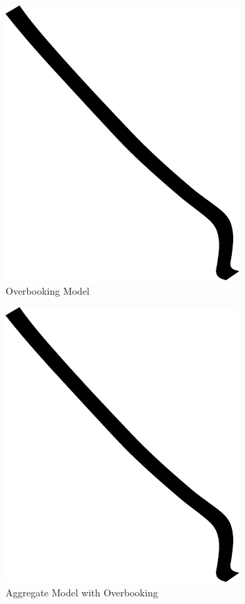 \begin{figure}
\centering
\includegraphics{img/example.pdf}
\caption{Overbooking Model}
\end{figure}

\begin{figure}
\centering
\includegraphics{img/example.pdf}
\caption{Aggregate Model with Overbooking}
\end{figure}


